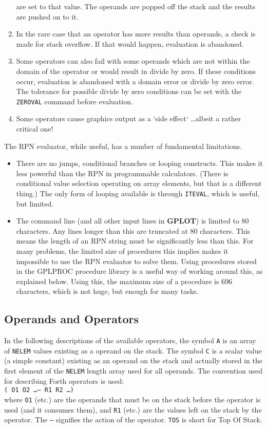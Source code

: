 \documentclass[a4paper,twoside,11pt]{article}
\newcommand{\newpara}{\par\vspace{4mm}\noindent}
\newcommand{\textttc}[1]{\texttt{\textcolor{OurRed}{#1}}}
\begin{document}
\begin{enumerate}
	are set to that value. The operands are popped off the stack and the results are pushed on to it.
\item In the rare case that an operator has more results than operands, a check is made for stack overflow. If that
	would happen, evaluation is abandoned.
\item Some operators can also fail with some operands which are not within the domain of the operator or would result
	in divide by zero. If these conditions occur, evaluation is abandoned with a domain error or divide by zero error.
	The tolerance for possible divide by zero conditions can be set with the \textttc{ZEROVAL} command before evaluation.
\item Some operators cause graphics output as a `side effect` \ldots albeit a rather critical one!
\end{enumerate}

\newpara
The RPN evaluator, while useful, has a number of fundamental limitations.
\begin{itemize}
\item There are no jumps, conditional branches or looping constructs. This makes it less powerful than the RPN in
  programmable calculators. (There is conditional value selection operating on array elements, but that is a different
  thing.) The only form of looping available is through \texttt{ITEVAL}, which is useful, but limited.
\item The command line (and all other input lines in \textbf{GPLOT}) is limited to 80 characters. Any lines longer
  than this are truncated at 80 characters. This means the length of an RPN string must be significantly less than this.
  For many problems, the limited size of procedures this implies makes it impossible to use the RPN evaluator to solve them.
  Using procedures stored in the GPLPROC procedure library is a useful way of working around this, as explained below. Using this,
  the maximum size of a procedure is 696 characters, which is not huge, but enough for many tasks.
\end{itemize}

\subsection{Operands and Operators}
In the following descriptions of the available operators, the symbol \texttt{A} is an array of \texttt{NELEM} values 
existing as a operand on the stack. The symbol \texttt{C} is a scalar value (a simple constant) existing as an operand
on the stack and actually stored in the first element of the \texttt{NELEM} length array used for all operands. The convention used for describing Forth operators is used:\\
\texttt{( O1 O2 \ldots -- R1 R2 \ldots )} \\
where \texttt{O1} (etc.) are the operands that must be on the stack before the operator is used (and it consumes them),
and \texttt{R1} (etc.) are the values left on the stack by the operator. The \texttt{--} signifies the action of the operator.
\texttt{TOS} is short for Top Of Stack.
\end{document}
